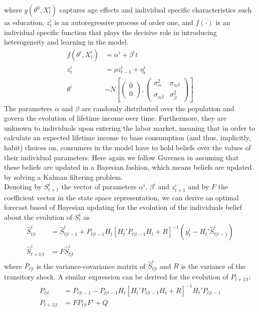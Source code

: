where $g(\theta^0, X_t^i)$ captures age effects and individual specific characteristics such as education, $z_t^i$ is an autoregressive process of order one, and $f(\cdot)$ is an individual specific function that plays the decisive role in introducing heterogeneity and learning in the model.
\begin{align*}
f(\theta^i, X_t^i) &= \alpha^i + \beta^i t \\
z_t^i &= \rho z_{t-1}^i + \eta_t^i \\
\theta^i &\sim N \left[ \begin{pmatrix} 0 \\ 0 \end{pmatrix}, \begin{pmatrix} \sigma_{\alpha}^2 & \sigma_{\alpha \beta} \\ \sigma_{\alpha \beta} & \sigma_{\beta}^2 \end{pmatrix} \right]
\end{align*}
The parameters $\alpha$ and $\beta$ are randomly distributed over the population and govern the evolution of lifetime income over time. Furthermore, they are unknown to individuals upon entering the labor market, meaning that in order to calculate an expected lifetime income to base consumption (and thus, implicitly, habit) choices on, consumers in the model have to hold beliefs over the values of their individual parameters. Here again we follow Guvenen in assuming that these beliefs are updated in a Bayesian fashion, which means beliefs are updated by solving a Kalman filtering problem. \\
Denoting by $S^i_{t+1}$ the vector of parameters $\alpha^i$, $\beta^i$ and $z^i_{t+1}$ and by $F$ the coefficient vector in the state space representation, we can derive an optimal forecast based of Bayesian updating for the evolution of the individuals belief about the evolution of $S^i_t$ as 
\begin{align}
\hat{S}^i_{t|t} &= \hat{S}^i_{t|t-1} + P_{t|t-1} H_t [H_t' P_{t|t-1} H_t + R]^{-1}(y_t^i - H_t' \hat{S}^i_{t|t-1}) \label{eq:KFS} \\
\hat{S}^i_{t+1|t} &= F \hat{S}^i_{t|t} \label{eq:TES}
\end{align}
where $P_{t|t}$ is the variance-covariance matrix of $\hat{S}^i_{t|t}$ and $R$ is the variance of the transitory shock. A similar expression can be derived for the evolution of $P_{t+1|t}$:
\begin{align}
P_{t|t} &= P_{t|t-1} - P_{t|t-1} H_t [ H_t' P_{t|t-1} H_t + R]^{-1} H_t' P_{t|t-1} \label{eq:KFP} \\
P_{t+1|t} &= F P_{t|t} F' + Q \label{eq:TEP}
\end{align}
